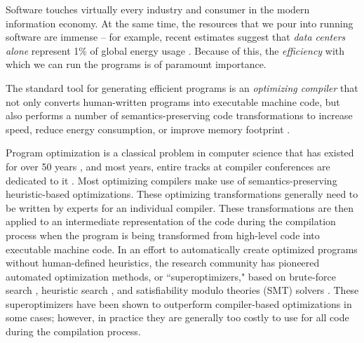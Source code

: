 \documentclass{article}
\begin{document}

Software touches virtually every industry and consumer in the modern information economy.
At the same time, the resources that we pour into running software are immense -- for example, recent estimates suggest that \emph{data centers alone} represent 1\% of global energy usage \citep{masanet2020recalibrating}.
Because of this, the \emph{efficiency} with which we can run the programs is of paramount importance.

The standard tool for generating efficient programs is an \emph{optimizing compiler} that not only converts human-written programs into executable machine code, but also performs a number of semantics-preserving code transformations to increase speed, reduce energy consumption, or improve memory footprint \citep{dragonbook}.

Program optimization is a classical problem in computer science that has existed for over 50 years \cite{mckeeman1965peephole, allen1971}, and most years, entire tracks at compiler conferences are dedicated to it . Most optimizing compilers make use of semantics-preserving heuristic-based optimizations. These optimizing transformations generally need to be written by experts for an individual compiler. These transformations are then applied to an intermediate representation of the code during the compilation process when the program is being transformed from high-level code into executable machine code. 
In an effort to automatically create optimized programs without human-defined heuristics, the research community has pioneered automated optimization methods, or ``superoptimizers," based on brute-force search \cite{massalin1987superoptimizer}, heuristic search \cite{schkufza2013stochastic}, and satisfiability modulo theories (SMT) solvers \cite{sasnauskas2017}. These superoptimizers have been shown to outperform compiler-based optimizations in some cases; however, in practice they are generally too costly to use for all code during the compilation process. 
\end{document}

